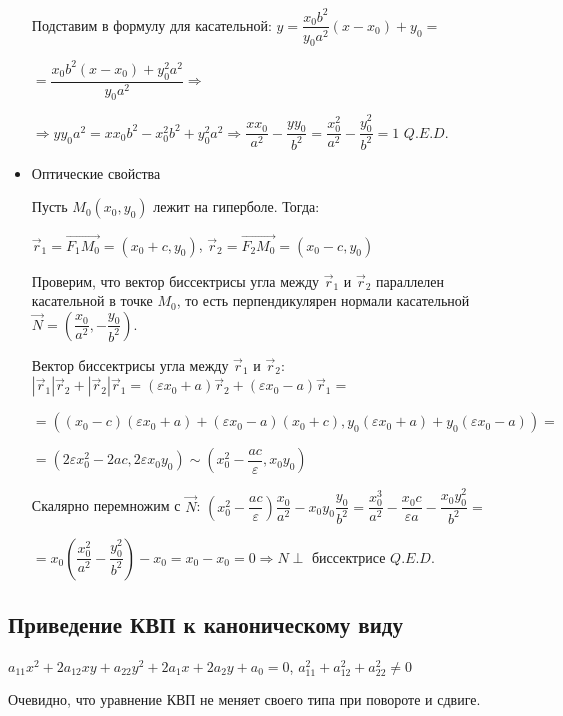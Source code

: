 \documentclass[twoside]{book}
\begin{document}
\begin{itemize}
          Подставим в формулу для касательной: \(y = \dfrac{x_0 b^2}{y_0 a^2}(x - x_0) + y_0=\)

          \(= \dfrac{x_0 b^2 (x - x_0) + y_0^2 a^2}{y_0 a^2} \Rightarrow\)

          \(\Rightarrow y y_0 a^2 = x x_0 b^2 - x_0^2 b^2 + y_0^2 a^2 \Rightarrow \dfrac{x x_0}{a^2} - \dfrac{y y_0}{b^2} = \dfrac{x_0^2}{a^2} - \dfrac{y_0^2}{b^2} = 1\) \(Q.E.D.\)

    \item Оптические свойства

          Пусть \(M_0(x_0, y_0)\) лежит на гиперболе. Тогда:

          \(\vec r_1 = \overrightarrow{F_1 M_0} = (x_0 + c, y_0)\), \(\vec r_2 = \overrightarrow{F_2 M_0} = (x_0 - c, y_0)\)

          Проверим, что вектор биссектрисы угла между \(\vec r_1\) и \(\vec r_2\) параллелен касательной в точке \(M_0\), то есть перпендикулярен нормали касательной \(\vec N = \left(\dfrac{x_0}{a^2}, -\dfrac{y_0}{b^2}\right)\).

          Вектор биссектрисы угла между \(\vec r_1\) и \(\vec r_2\): \(|\vec r_1|\vec r_2 + |\vec r_2| \vec r_1 = (\varepsilon x_0 + a) \vec r_2 + (\varepsilon x_0 - a) \vec r_1 =\)

          \(=((x_0 - c)(\varepsilon x_0 + a) + (\varepsilon x_0 - a)(x_0 + c), y_0(\varepsilon x_0 + a) + y_0(\varepsilon x_0 - a)) =\)

          \(= (2\varepsilon x_0^2 - 2ac, 2 \varepsilon x_0 y_0) \sim \left(x_0^2 - \dfrac{ac}{\varepsilon}, x_0 y_0\right)\)

          Скалярно перемножим с \(\vec N\): \(\left(x_0^2 - \dfrac{ac}{\varepsilon}\right)\dfrac{x_0}{a^2} - x_0 y_0 \dfrac{y_0}{b^2} = \dfrac{x_0^3}{a^2} - \dfrac{x_0 c}{\varepsilon a} - \dfrac{x_0 y_0^2}{b^2} =\)

          \(= x_0 \left(\dfrac{x_0^2}{a^2} - \dfrac{y_0^2}{b^2}\right) - x_0 = x_0 - x_0 = 0 \Rightarrow N \perp\) биссектрисе \(Q.E.D.\)
\end{itemize}

\subsection{Приведение КВП к каноническому виду}
\(a_{11} x^2 + 2 a_{12} x y + a_{22} y^2 + 2 a_1 x + 2 a_2 y + a_0 = 0\), \(a_{11}^2 + a_{12}^2 + a_{22}^2 \neq 0\)

Очевидно, что уравнение КВП не меняет своего типа при повороте и сдвиге.
\end{document}
